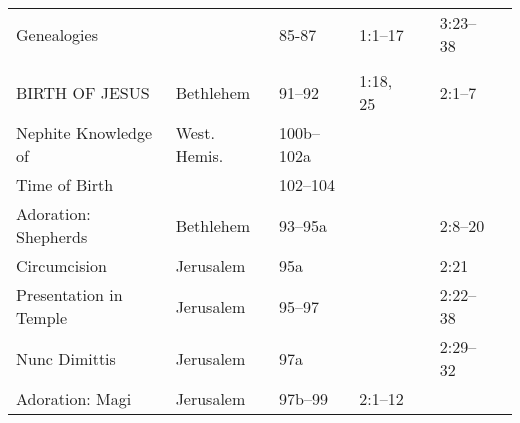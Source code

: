 \begin{longtable}[h]{lllllll}
Genealogies                &                  & 85-87      & 1:1--17  &  & 3:23--38 & \\
\\
BIRTH OF JESUS             & Bethlehem        & 91--92     & 1:18, 25 &  & 2:1--7   & \\
\quad Nephite Knowledge of & West. Hemis.     & 100b--102a &          &  &          & \\
\quad Time of Birth        &                  & 102--104   &          &  &          & \\
Adoration: Shepherds       & Bethlehem        & 93--95a    &          &  & 2:8--20  & \\
Circumcision               & Jerusalem        & 95a        &          &  & 2:21     & \\
Presentation in Temple     & Jerusalem        & 95--97     &          &  & 2:22--38 & \\
\quad Nunc Dimittis        & Jerusalem        & 97a        &          &  & 2:29--32 & \\
Adoration: Magi            & Jerusalem        & 97b--99    & 2:1--12  &  &          & \\
\end{longtable}
